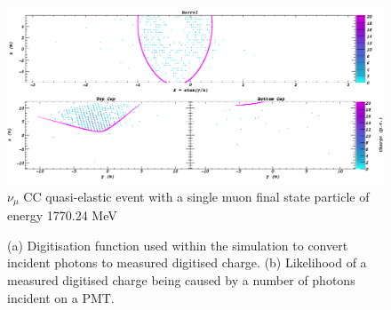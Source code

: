 \begin{figure} %
    \includegraphics[width=\textwidth]{diagrams/4-chips/sim_event.png}
    \caption[sim event short]
    {$\nu_{\mu}$ CC quasi-elastic event with a single muon final state particle of energy
        1770.24 MeV}
    \label{fig:sim_event}
\end{figure}

\begin{figure} %
    \centering
    \quad
    \caption[Simulation PMT digitisaion function.]
    {(a) Digitisation function used within the simulation to convert incident photons to measured
        digitised charge. (b) Likelihood of a measured digitised charge being caused by a number
        of photons incident on a PMT.}
    \label{fig:digitisation}
\end{figure}
